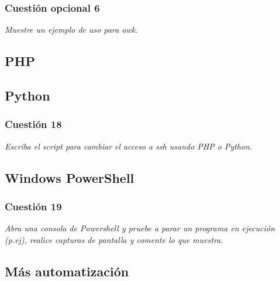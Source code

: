 \subsubsection{Cuestión opcional 6}
\textit{Muestre un ejemplo de uso para awk.}


\subsection{PHP}
\subsection{Python}
\subsubsection{Cuestión 18}
\textit{Escriba el script para cambiar el acceso a ssh usando PHP o Python.}


\subsection{Windows PowerShell}
\subsubsection{Cuestión 19}
\textit{Abra una consola de Powershell y pruebe a parar un programa en ejecución (p.ej), realice capturas de pantalla y comente lo que muestra.}

\subsection{Más automatización}


\newpage




